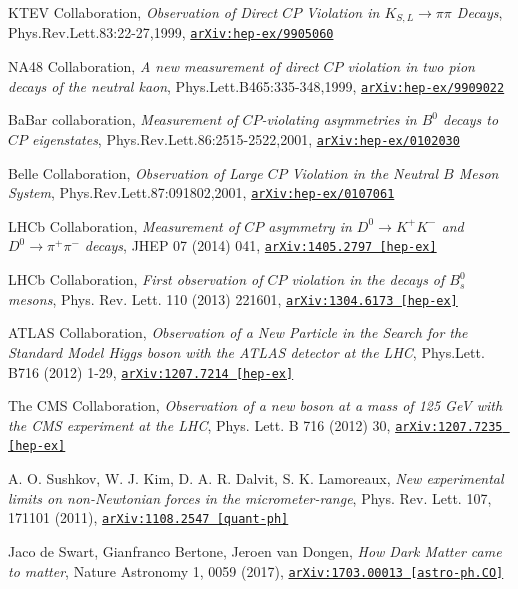 \documentclass[11pt,a4paper,openright,twoside]{report}
\newcommand{\bibref}[4]{#1, \textit{#2}, #3 #4}
\begin{document}
\begin{thebibliography}{9}
	\bibref{KTEV Collaboration}{Observation of Direct $CP$ Violation in $K_{S,L}\to \pi\pi$ Decays}{Phys.Rev.Lett.83:22-27,1999,}{\href{https://arxiv.org/abs/hep-ex/9905060}{\texttt{arXiv:hep-ex/9905060}}}

 \bibref{NA48 Collaboration}{A new measurement of direct $CP$ violation in two pion decays of the neutral kaon}{Phys.Lett.B465:335-348,1999,}{\href{https://arxiv.org/abs/hep-ex/9909022}{\texttt{arXiv:hep-ex/9909022}}}

	\bibref{BaBar collaboration}{Measurement of $CP$-violating asymmetries in $B^0$ decays to $CP$ eigenstates}{Phys.Rev.Lett.86:2515-2522,2001,}{\href{https://arxiv.org/abs/hep-ex/0102030}{\texttt{arXiv:hep-ex/0102030}}}

	\bibref{Belle Collaboration}{Observation of Large $CP$ Violation in the Neutral $B$ Meson System}{Phys.Rev.Lett.87:091802,2001,}{\href{https://arxiv.org/abs/hep-ex/0107061}{\texttt{arXiv:hep-ex/0107061}}}

	\bibref{LHCb Collaboration}{Measurement of $CP$ asymmetry in $D^0 \to K^+ K^-$ and $D^0 \to \pi^+ \pi^-$ decays}{JHEP 07 (2014) 041,}{\href{https://arxiv.org/abs/1405.2797}{\texttt{arXiv:1405.2797 [hep-ex]}}}

	\bibref{LHCb Collaboration}{First observation of $CP$ violation in the decays of $B^0_s$ mesons}{Phys. Rev. Lett. 110 (2013) 221601,}{\href{https://arxiv.org/abs/1304.6173}{\texttt{arXiv:1304.6173 [hep-ex]}}}
	
	\bibref{ATLAS Collaboration}{Observation of a New Particle in the Search for the Standard Model Higgs boson with the ATLAS detector at the LHC}{Phys.Lett. B716 (2012) 1-29,}{\href{https://arxiv.org/abs/1207.7214}{\texttt{arXiv:1207.7214 [hep-ex]}}}
	
	\bibref{The CMS Collaboration}{Observation of a new boson at a mass of 125 GeV with the CMS experiment at the LHC}{Phys. Lett. B 716 (2012) 30,}{\href{https://arxiv.org/abs/1207.7235}{\texttt{arXiv:1207.7235 [hep-ex]}}}
	
	\bibref{A. O. Sushkov, W. J. Kim, D. A. R. Dalvit, S. K. Lamoreaux}{New experimental limits on non-Newtonian forces in the micrometer-range}{Phys. Rev. Lett. 107, 171101 (2011),}{\href{https://arxiv.org/abs/1108.2547}{\texttt{arXiv:1108.2547 [quant-ph]}}}
	
	\bibref{Jaco de Swart, Gianfranco Bertone, Jeroen van Dongen}{How Dark Matter came to matter}{Nature Astronomy 1, 0059 (2017),}{\href{https://arxiv.org/abs/1703.00013}{\texttt{arXiv:1703.00013 [astro-ph.CO]}}}
	

\end{thebibliography}
\end{document}
